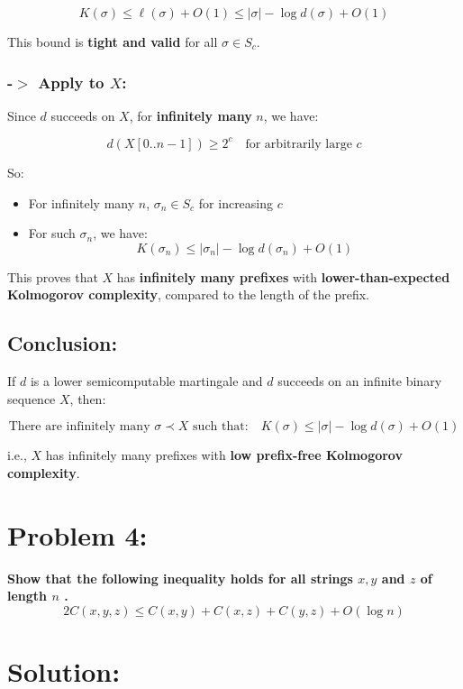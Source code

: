 \documentclass[12pt]{article}
\begin{document}
\[
K(\sigma) \leq \ell(\sigma) + O(1) \leq |\sigma| - \log d(\sigma) + O(1)
\]

This bound is \textbf{tight and valid} for all \( \sigma \in S_c \).

\subsubsection*{-$>$ Apply to \( X \):}

Since \( d \) succeeds on \( X \), for \textbf{infinitely many} \( n \), we have:

\[
d(X[0..n-1]) \geq 2^c \quad \text{for arbitrarily large } c
\]

So:
\begin{itemize}
  \item For infinitely many \( n \), \( \sigma_n \in S_c \) for increasing \( c \)
  \item For such \( \sigma_n \), we have:
  \[
  K(\sigma_n) \leq |\sigma_n| - \log d(\sigma_n) + O(1)
  \]
\end{itemize}

This proves that \( X \) has \textbf{infinitely many prefixes} with \textbf{lower-than-expected Kolmogorov complexity}, compared to the length of the prefix.

\subsection*{Conclusion:}

If \( d \) is a lower semicomputable martingale and \( d \) succeeds on an infinite binary sequence \( X \), then:

\[
\text{There are infinitely many } \sigma \prec X \text{ such that:} \quad
K(\sigma) \leq |\sigma| - \log d(\sigma) + O(1)
\]

i.e., \( X \) has infinitely many prefixes with \textbf{low prefix-free Kolmogorov complexity}.  

\newpage
\section*{Problem 4:}
 \textbf{Show that the following inequality holds for all strings $x, y$ and $z$ of length $n$ .}
\[
2C(x, y, z) \leq C(x, y) + C(x, z) + C(y, z) + O(\log n)
\]

\section*{Solution:}
\end{document}
